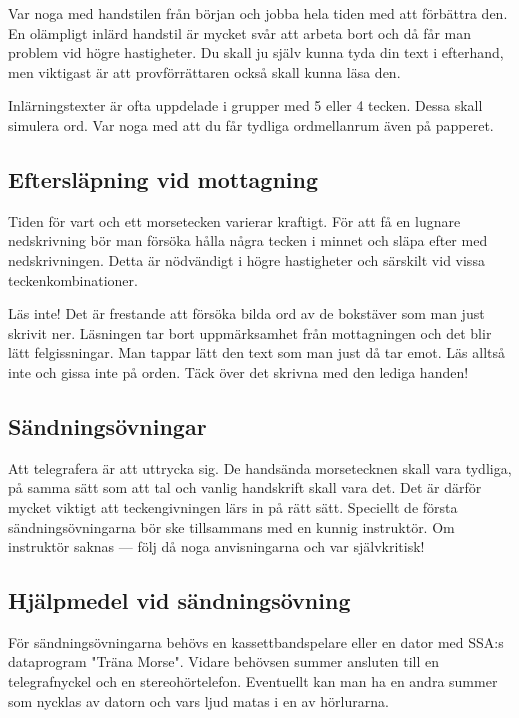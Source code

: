 \documentclass[a4paper,twoside,twocolumn,openright]{book}
\begin{document}
Var noga med handstilen från början och jobba hela tiden med att förbättra den. En
olämpligt inlärd handstil är mycket svår att arbeta bort och då får man problem vid högre
hastigheter. Du skall ju själv kunna tyda din text i efterhand, men viktigast är att
provförrättaren också skall kunna läsa den.

Inlärningstexter är ofta uppdelade i grupper med 5 eller 4 tecken. Dessa skall simulera
ord. Var noga med att du får tydliga ordmellanrum även på papperet.

\subsection{Eftersläpning vid mottagning}

Tiden för vart och ett morsetecken varierar kraftigt. För att få en lugnare nedskrivning
bör man försöka hålla några tecken i minnet och släpa efter med nedskrivningen. Detta
är nödvändigt i högre hastigheter och särskilt vid vissa teckenkombinationer.

Läs inte! Det är frestande att försöka bilda ord av de bokstäver som man just
skrivit ner. Läsningen tar bort uppmärksamhet från mottagningen och det blir lätt felgissningar. Man tappar lätt den text som man just då tar emot. Läs alltså inte och
gissa inte på orden. Täck över det skrivna med den lediga handen!

\subsection{Sändningsövningar}

Att telegrafera är att uttrycka sig. De handsända morsetecknen skall vara tydliga, på
samma sätt som att tal och vanlig handskrift skall vara det. Det är därför mycket viktigt
att teckengivningen lärs in på rätt sätt. Speciellt de första sändningsövningarna bör ske
tillsammans med en kunnig instruktör.
Om instruktör saknas --- följ då noga anvisningarna och var självkritisk!

\subsection{Hjälpmedel vid sändningsövning}

För sändningsövningarna behövs en kassettbandspelare eller en dator med SSA:s
dataprogram "Träna Morse". Vidare behövsen summer ansluten till en telegrafnyckel
och en stereohörtelefon. Eventuellt kan man ha en andra summer som nycklas av datorn
och vars ljud matas i en av hörlurarna.
\end{document}
